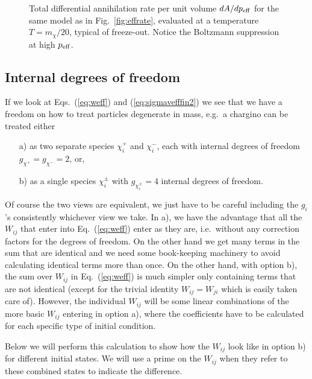 \begin{figure}
  \centerline{}
  \caption{Total differential annihilation rate per unit volume 
    $dA/dp_{\rm eff}$ for the same model as in
    Fig.~\protect\ref{fig:effrate}, evaluated at a temperature
    $T=m_\chi/20$, typical of freeze-out. Notice the Boltzmann
    suppression at high $p_{\rm eff}$.}
  \label{fig:k1effrate}
\end{figure}

\subsection{Internal degrees of freedom}
\label{sec:dof}

If we look at Eqs.~(\ref{eq:weff}) and (\ref{eq:sigmavefffin2}) we see
that we have a freedom on how to treat particles degenerate in mass,
e.g.\ a chargino can be treated either 
\begin{enumerate}
\item[a)]
  as two separate species
  $\chi_{i}^+$ and $\chi_{i}^-$, each with internal degrees of freedom
  $g_{\chi^+}=g_{\chi^-}=2$, or,
\item[b)]
  as a single species
  $\chi_{i}^\pm$ with $g_{\chi_{i}^\pm}=4$ internal degrees of freedom. 
\end{enumerate}
Of course the two views are equivalent, we just have to be careful 
including the $g_{i}$'s consistently whichever view we take.
In a), we have the advantage that all the $W_{ij}$ that enter into 
Eq.~(\ref{eq:weff}) enter as they are, i.e.\ without any correction 
factors for the degrees of freedom. On the other hand we get many 
terms in the sum that are identical and we need some book-keeping 
machinery to avoid calculating identical terms more than once. On the 
other hand, with option b), the sum over $W_{ij}$ in Eq.~(\ref{eq:weff}) 
is much simpler only containing terms that are not identical (except 
for the trivial identity $W_{ij}=W_{ji}$ which is easily taken care of). 
However, the individual $W_{ij}$ will be some linear combinations of 
the more basic $W_{ij}$ entering in option a), where the coefficients 
have to be calculated for each specific type of initial condition. 

Below we will perform this calculation to show how the $W_{ij}$ look 
like in option b) for different initial states. We will use a prime on 
the $W_{ij}$ when they refer to these combined states to indicate the 
difference.

